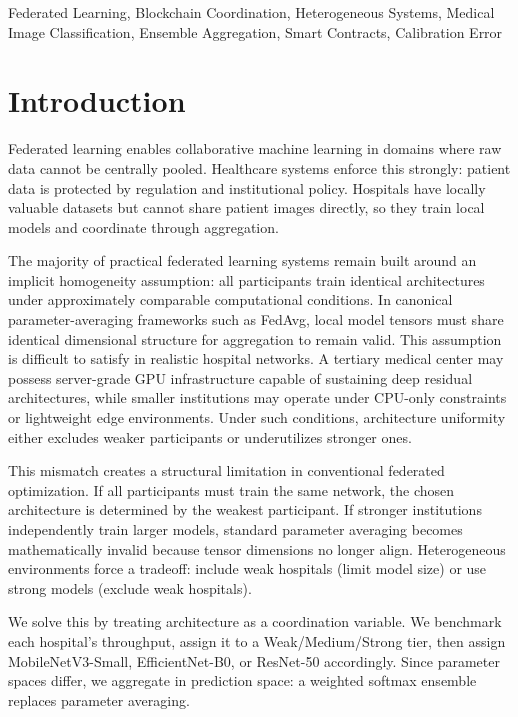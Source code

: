 \documentclass[conference]{IEEEtran}
\begin{document}
\begin{IEEEkeywords}
Federated Learning, Blockchain Coordination, Heterogeneous Systems, Medical Image Classification, Ensemble Aggregation, Smart Contracts, Calibration Error
\end{IEEEkeywords}

\section{Introduction}

Federated learning enables collaborative machine learning in domains where raw data cannot be centrally pooled. Healthcare systems enforce this strongly: patient data is protected by regulation and institutional policy. Hospitals have locally valuable datasets but cannot share patient images directly, so they train local models and coordinate through aggregation.

The majority of practical federated learning systems remain built around an implicit homogeneity assumption: all participants train identical architectures under approximately comparable computational conditions. In canonical parameter-averaging frameworks such as FedAvg, local model tensors must share identical dimensional structure for aggregation to remain valid. This assumption is difficult to satisfy in realistic hospital networks. A tertiary medical center may possess server-grade GPU infrastructure capable of sustaining deep residual architectures, while smaller institutions may operate under CPU-only constraints or lightweight edge environments. Under such conditions, architecture uniformity either excludes weaker participants or underutilizes stronger ones.

This mismatch creates a structural limitation in conventional federated optimization. If all participants must train the same network, the chosen architecture is determined by the weakest participant. If stronger institutions independently train larger models, standard parameter averaging becomes mathematically invalid because tensor dimensions no longer align. Heterogeneous environments force a tradeoff: include weak hospitals (limit model size) or use strong models (exclude weak hospitals).

We solve this by treating architecture as a coordination variable. We benchmark each hospital's throughput, assign it to a Weak/Medium/Strong tier, then assign MobileNetV3-Small, EfficientNet-B0, or ResNet-50 accordingly. Since parameter spaces differ, we aggregate in prediction space: a weighted softmax ensemble replaces parameter averaging.
\end{document}
